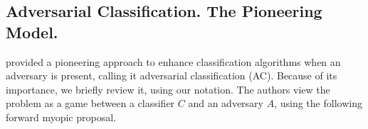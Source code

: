 \subsection{Adversarial Classification. The Pioneering Model.%
}
\textcite{dalvi2004adversarial} provided a pioneering approach to enhance classification algorithms when an adversary is present, calling it adversarial classification (AC).
 Because of its importance,
we briefly review it, using our notation. 
The authors view the problem as a game between a classifier $C$ and an adversary $A$,
using the following forward myopic proposal.


